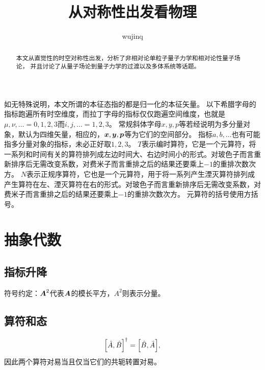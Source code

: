 \documentclass[hyperref, UTF8, a4paper]{ctexart}
\title{从对称性出发看物理}
\author{wujinq}
\begin{document}
\maketitle

\begin{abstract}
    本文从直觉性的时空对称性出发，分析了非相对论单粒子量子力学和相对论性量子场论，
    并且讨论了从量子场论到量子力学的过渡以及多体系统等话题。
\end{abstract}
\vspace{2em}


如无特殊说明，本文所谓的本征态指的都是归一化的本征矢量。
以下希腊字母的指标跑遍所有时空维度，而拉丁字母的指标仅仅跑遍空间维度，也就是$\mu, \nu, \ldots = 0, 1, 2, 3$而$i, j, \ldots = 1, 2, 3$。
常规斜体字母$x, y, p$等若经说明为多分量对象，默认为四维矢量，相应的，$\vb*{x}, \vb*{y}, \vb*{p}$等为它们的空间部分。
指标$a,b,\ldots$也有可能指多分量对象的指标，未必正好取$1, 2, 3$。
$T$表示编时算符，它是一个元算符，将一系列和时间有关的算符排列成左边时间大、右边时间小的形式。对玻色子而言重新排序后无需改变系数，对费米子而言重排之后的结果还要乘上$-1$的重排次数次方。
$N$表示正规序算符，它也是一个元算符，用于将一系列产生湮灭算符排列成产生算符在左、湮灭算符在右的形式。对玻色子而言重新排序后无需改变系数，对费米子而言重排之后的结果还要乘上$-1$的重排次数次方。
元算符的括号使用方括号。

\section{抽象代数}

\subsection{指标升降}

符号约定：$\vb*{A}^2$代表$\vb*{A}$的模长平方，$A^2$则表示分量。

\subsection{算符和态}

\[
    \comm{\hat{A}}{\hat{B}}^\dagger = \comm{\hat{B}}{\hat{A}},
\]
因此两个算符对易当且仅当它们的共轭转置对易。
\end{document}
